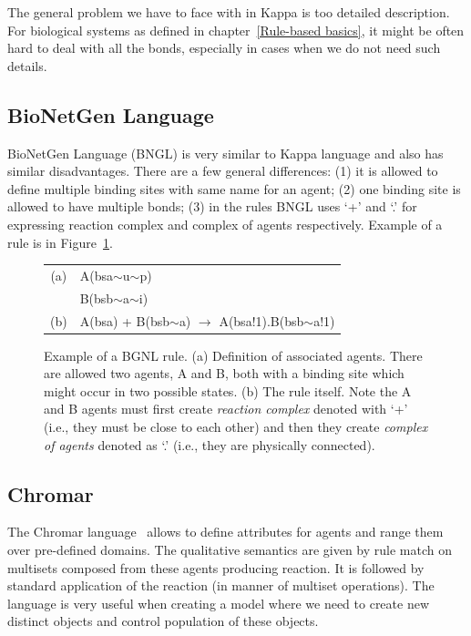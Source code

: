 \documentclass[12pt]{fithesis2}
\begin{document}
The general problem we have to face with in Kappa is too detailed description. For biological systems as defined in chapter~\ref{Rule-based basics}, it might be often hard to deal with all the bonds, especially in cases when we do not need such details.

\subsection{BioNetGen Language}
\label{bngl}

BioNetGen Language (BNGL) \cite{BNGL} is very similar to Kappa language and also has similar disadvantages. There are a few general differences: (1) it is allowed to define multiple binding sites with same name for an agent; (2) one binding site is allowed to have multiple bonds; (3) in the rules BNGL uses `+' and `.' for expressing reaction complex and complex of agents respectively. Example of a rule is in Figure~\ref{bngl-rule}.

\begin{figure}[!h]
\begin{center}
\begin{tabular}{c l}
(a) & A(bsa$\sim$u$\sim$p) \\
  & B(bsb$\sim$a$\sim$i) \\
(b) & A(bsa) + B(bsb$\sim$a) $\rightarrow$ A(bsa!1).B(bsb$\sim$a!1) \\
\end{tabular}
\end{center}
\caption{Example of a BGNL rule. (a) Definition of associated agents. There are allowed two agents, A and B, both with a binding site which might occur in two possible states. (b) The rule itself. Note the A and B agents must first create \emph{reaction complex} denoted with `+' (i.e., they must be close to each other) and then they create \emph{complex of agents} denoted as `.' (i.e., they are physically connected).}\label{bngl-rule}
\end{figure}

\subsection{Chromar}

The Chromar language~\cite{honorato2017chromar} allows to define attributes for agents and range them over pre-defined domains. The qualitative semantics are given by rule match on multisets composed from these agents producing reaction. It is followed by standard application of the reaction (in manner of multiset operations). The language is very useful when creating a model where we need to create new distinct objects and control population of these objects.
\end{document}
